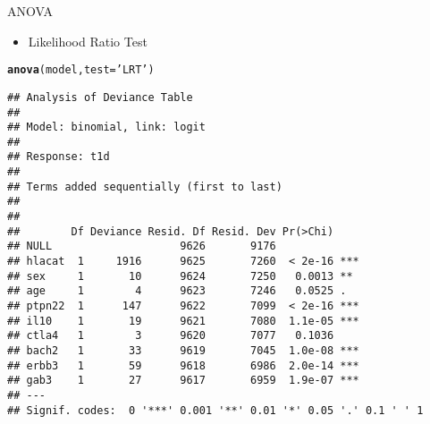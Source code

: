 \documentclass{beamer}
\makeatletter
\newcommand{\hlstr}[1]{\textcolor[rgb]{0.192,0.494,0.8}{#1}}%
\newcommand{\hlstd}[1]{\textcolor[rgb]{0.345,0.345,0.345}{#1}}%
\newcommand{\hlkwc}[1]{\textcolor[rgb]{0.333,0.667,0.333}{#1}}%
\newcommand{\hlkwd}[1]{\textcolor[rgb]{0.737,0.353,0.396}{\textbf{#1}}}%
\newenvironment{kframe}{%
 \def\at@end@of@kframe{}%
 \ifinner\ifhmode%
  \def\at@end@of@kframe{\end{minipage}}%
  \begin{minipage}{\columnwidth}%
 \fi\fi%
 \def\FrameCommand##1{\hskip\@totalleftmargin \hskip-\fboxsep
 \colorbox{shadecolor}{##1}\hskip-\fboxsep
     \hskip-\linewidth \hskip-\@totalleftmargin \hskip\columnwidth}%
 \MakeFramed {\advance\hsize-\width
   \@totalleftmargin\z@ \linewidth\hsize
   \@setminipage}}%
 {\par\unskip\endMakeFramed%
 \at@end@of@kframe}
\newenvironment{knitrout}{}{} %
\makeatother
\begin{document}
\begin{frame}[fragile]{ANOVA}
  \begin{itemize}
    \item Likelihood Ratio Test
  \end{itemize}
\begin{knitrout}\tiny
{}\color{fgcolor}\begin{kframe}
\begin{alltt}
\hlkwd{anova}\hlstd{(model,} \hlkwc{test}\hlstd{=}\hlstr{'LRT'}\hlstd{)}
\end{alltt}
\begin{verbatim}
## Analysis of Deviance Table
## 
## Model: binomial, link: logit
## 
## Response: t1d
## 
## Terms added sequentially (first to last)
## 
## 
##        Df Deviance Resid. Df Resid. Dev Pr(>Chi)    
## NULL                    9626       9176             
## hlacat  1     1916      9625       7260  < 2e-16 ***
## sex     1       10      9624       7250   0.0013 ** 
## age     1        4      9623       7246   0.0525 .  
## ptpn22  1      147      9622       7099  < 2e-16 ***
## il10    1       19      9621       7080  1.1e-05 ***
## ctla4   1        3      9620       7077   0.1036    
## bach2   1       33      9619       7045  1.0e-08 ***
## erbb3   1       59      9618       6986  2.0e-14 ***
## gab3    1       27      9617       6959  1.9e-07 ***
## ---
## Signif. codes:  0 '***' 0.001 '**' 0.01 '*' 0.05 '.' 0.1 ' ' 1
\end{verbatim}
\end{kframe}
\end{knitrout}
\end{frame}
\end{document}
